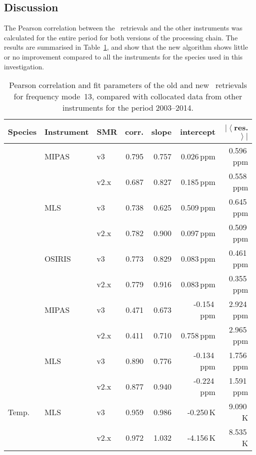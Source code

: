\subsection{Discussion}
\label{sec:fm13:discussion}
The Pearson correlation between the \smr\ retrievals and the other instruments
was calculated for the entire period for both versions of the processing chain.
The results are summarised in Table~\ref{tab:fm13:stats}, and show that the
new algorithm shows little or no improvement compared to all the instruments
for the species used in this investigation.


\begin{table}[hbt]
\centering
\caption{Pearson correlation and fit parameters of the old and new \smr\
retrievals for frequency mode~13, compared with collocated data from other
instruments for the period 2003--2014.
}
\label{tab:fm13:stats}
\begin{tabular}{lllrrrr}
    \toprule
    \textbf{Species} & \textbf{Instrument} & \textbf{SMR} & \textbf{corr.} & \textbf{slope} & \textbf{intercept} & \textbf{$\left|\left<\right.\right.$res.$\left.\left.\right>\right|$} \\
    \midrule
    \chem{O3}   & MIPAS     & v3    & 0.795 & 0.757 & 0.026\,ppm    & 0.596\,ppm \\
                &           & v2.x  & 0.687 & 0.827 & 0.185\,ppm    & 0.558\,ppm \\
    \cline{2-7}
                & MLS       & v3    & 0.738 & 0.625 & 0.509\,ppm    & 0.645\,ppm \\
                &           & v2.x  & 0.782 & 0.900 & 0.097\,ppm    & 0.509\,ppm \\
    \cline{2-7}
                & OSIRIS    & v3    & 0.773 & 0.829 & 0.083\,ppm    & 0.461\,ppm \\
                &           & v2.x  & 0.779 & 0.916 & 0.083\,ppm    & 0.355\,ppm \\
    \midrule
    \chem{H_2O} & MIPAS     & v3    & 0.471 & 0.673 & -0.154\,ppm   & 2.924\,ppm \\
                &           & v2.x  & 0.411 & 0.710 & 0.758\,ppm    & 2.965\,ppm \\
    \cline{2-7}
                & MLS       & v3    & 0.890 & 0.776 & -0.134\,ppm   & 1.756\,ppm \\
                &           & v2.x  & 0.877 & 0.940 & -0.224\,ppm   & 1.591\,ppm \\
    \midrule
    Temp.       & MLS       & v3    & 0.959 & 0.986 & -0.250\,K     &  9.090\,K \\
                &           & v2.x  & 0.972 & 1.032 & -4.156\,K     &  8.535\,K \\
    \bottomrule
\end{tabular}
\end{table}

